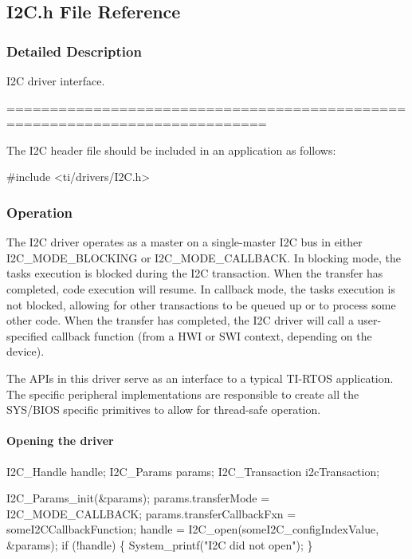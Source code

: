 \subsection{I2\+C.\+h File Reference}
\label{_i2_c_8h}


\subsubsection{Detailed Description}
I2\+C driver interface. 

============================================================================

The I2\+C header file should be included in an application as follows\+: 
\begin{DoxyCode}
\textcolor{preprocessor}{#include <ti/drivers/I2C.h>}
\end{DoxyCode}


\subsubsection*{Operation}

The I2\+C driver operates as a master on a single-\/master I2\+C bus in either I2\+C\+\_\+\+M\+O\+D\+E\+\_\+\+B\+L\+O\+C\+K\+I\+N\+G or I2\+C\+\_\+\+M\+O\+D\+E\+\_\+\+C\+A\+L\+L\+B\+A\+C\+K. In blocking mode, the task\textquotesingle{}s execution is blocked during the I2\+C transaction. When the transfer has completed, code execution will resume. In callback mode, the task\textquotesingle{}s execution is not blocked, allowing for other transactions to be queued up or to process some other code. When the transfer has completed, the I2\+C driver will call a user-\/specified callback function (from a H\+W\+I or S\+W\+I context, depending on the device).

The A\+P\+Is in this driver serve as an interface to a typical T\+I-\/\+R\+T\+O\+S application. The specific peripheral implementations are responsible to create all the S\+Y\+S/\+B\+I\+O\+S specific primitives to allow for thread-\/safe operation.

\paragraph*{Opening the driver}


\begin{DoxyCode}
I2C_Handle      handle;
I2C_Params      params;
I2C_Transaction i2cTransaction;

I2C_Params_init(&params);
params.transferMode  = I2C_MODE_CALLBACK;
params.transferCallbackFxn = someI2CCallbackFunction;
handle = I2C_open(someI2C\_configIndexValue, &params);
\textcolor{keywordflow}{if} (!handle) \{
    System\_printf(\textcolor{stringliteral}{"I2C did not open"});
\}
\end{DoxyCode}



